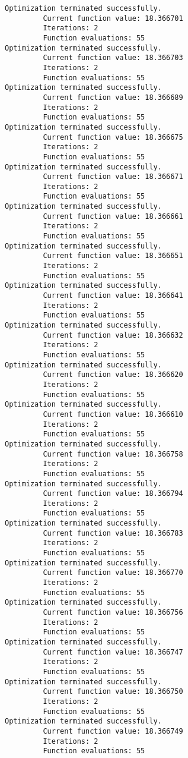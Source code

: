 \documentclass[11pt]{article}
\begin{document}
\begin{Verbatim}[commandchars=\\\{\}]
Optimization terminated successfully.
         Current function value: 18.366701
         Iterations: 2
         Function evaluations: 55
Optimization terminated successfully.
         Current function value: 18.366703
         Iterations: 2
         Function evaluations: 55
Optimization terminated successfully.
         Current function value: 18.366689
         Iterations: 2
         Function evaluations: 55
Optimization terminated successfully.
         Current function value: 18.366675
         Iterations: 2
         Function evaluations: 55
Optimization terminated successfully.
         Current function value: 18.366671
         Iterations: 2
         Function evaluations: 55
Optimization terminated successfully.
         Current function value: 18.366661
         Iterations: 2
         Function evaluations: 55
Optimization terminated successfully.
         Current function value: 18.366651
         Iterations: 2
         Function evaluations: 55
Optimization terminated successfully.
         Current function value: 18.366641
         Iterations: 2
         Function evaluations: 55
Optimization terminated successfully.
         Current function value: 18.366632
         Iterations: 2
         Function evaluations: 55
Optimization terminated successfully.
         Current function value: 18.366620
         Iterations: 2
         Function evaluations: 55
Optimization terminated successfully.
         Current function value: 18.366610
         Iterations: 2
         Function evaluations: 55
Optimization terminated successfully.
         Current function value: 18.366758
         Iterations: 2
         Function evaluations: 55
Optimization terminated successfully.
         Current function value: 18.366794
         Iterations: 2
         Function evaluations: 55
Optimization terminated successfully.
         Current function value: 18.366783
         Iterations: 2
         Function evaluations: 55
Optimization terminated successfully.
         Current function value: 18.366770
         Iterations: 2
         Function evaluations: 55
Optimization terminated successfully.
         Current function value: 18.366756
         Iterations: 2
         Function evaluations: 55
Optimization terminated successfully.
         Current function value: 18.366747
         Iterations: 2
         Function evaluations: 55
Optimization terminated successfully.
         Current function value: 18.366750
         Iterations: 2
         Function evaluations: 55
Optimization terminated successfully.
         Current function value: 18.366749
         Iterations: 2
         Function evaluations: 55

\end{Verbatim}
\end{document}

